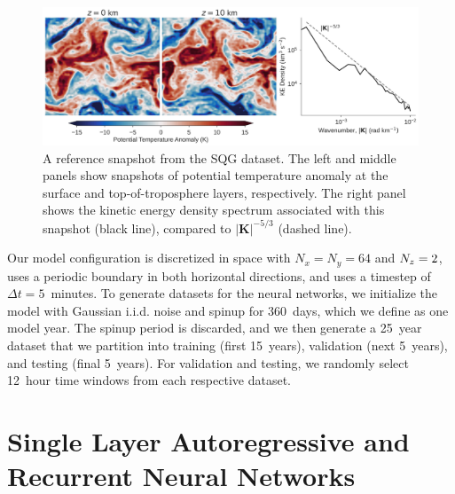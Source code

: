 \documentclass[draft]{agujournal2019}
\begin{document}
\begin{figure}
    \centering
    \includegraphics[width=\textwidth]{figures/sqg_reference_plot.jpg}
    \caption{A reference snapshot from the SQG dataset. The left and middle panels
        show snapshots of potential temperature anomaly at the surface and
        top-of-troposphere layers, respectively.
        The right panel shows the kinetic energy density spectrum associated
        with this snapshot (black line), compared to
        $|\mathbf{K}|^{-5/3}$ (dashed line).
    }
    \label{fig:sqg-reference}
\end{figure}

Our model configuration is discretized in space with $N_x = N_y = 64$ and $N_{z}=2$,
uses a periodic boundary in both horizontal directions,
and uses a timestep of $\Delta t=5$~minutes.
To generate datasets for the neural networks, we initialize the model with Gaussian i.i.d.
noise and spinup for 360~days, which we define as one model year.
The spinup period is discarded, and we then generate a 25~year dataset that we partition
into training (first 15~years), validation (next 5~years), and testing
(final 5~years).
For validation and testing, we randomly select 12~hour time windows from each
respective dataset.


\section{Single Layer Autoregressive and Recurrent Neural Networks}
\label{sec:rnn-architecture}
\end{document}
